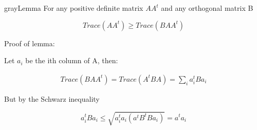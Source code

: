\label{ap:lemma}
\begin{mybox}{gray}{Lemma}
For any positive definite matrix $A A^t$ and any orthogonal matrix B 

\[ Trace( A A^t ) \geq Trace (B A A^t) \]

\end{mybox}


Proof of lemma:

Let $a_i$ be the ith column of A, then:

\begin{align*}
Trace( B A A^t ) = Trace (A^t B A) = \sum\limits_i a_i^t B a_i 
\end{align*}

But by the Schwarz inequality

\[ a_i^t B a_i \leq \sqrt{ a_i^t a_i (a^t B^t B a_i)} = a^t a_i \]
